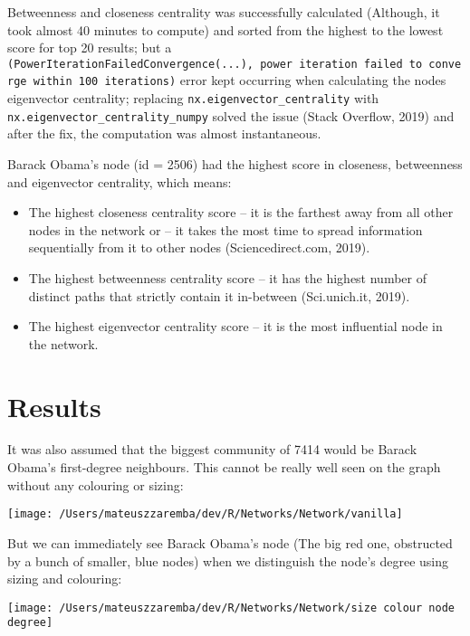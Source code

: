 \documentclass[
]{article}
\providecommand{\tightlist}{%
  \setlength{\itemsep}{0pt}\setlength{\parskip}{0pt}}
\begin{document}
Betweenness and closeness centrality was successfully calculated
(Although, it took almost 40 minutes to compute) and sorted from the
highest to the lowest score for top 20 results; but a
\texttt{(PowerIterationFailedConvergence(...),\ \textquotesingle{}power\ iteration\ failed\ to\ converge\ within\ 100\ iterations\textquotesingle{})}
error kept occurring when calculating the nodes eigenvector centrality;
replacing \texttt{nx.eigenvector\_centrality} with
\texttt{nx.eigenvector\_centrality\_numpy} solved the issue (Stack
Overflow, 2019) and after the fix, the computation was almost
instantaneous.

Barack Obama's node (id = 2506) had the highest score in closeness,
betweenness and eigenvector centrality, which means:

\begin{itemize}
\tightlist
\item
  The highest closeness centrality score -- it is the farthest away from
  all other nodes in the network or -- it takes the most time to spread
  information sequentially from it to other nodes (Sciencedirect.com,
  2019).
\item
  The highest betweenness centrality score -- it has the highest number
  of distinct paths that strictly contain it in-between (Sci.unich.it,
  2019).
\item
  The highest eigenvector centrality score -- it is the most influential
  node in the network.
\end{itemize}

\hypertarget{results}{%
\section{Results}\label{results}}

It was also assumed that the biggest community of 7414 would be Barack
Obama's first-degree neighbours. This cannot be really well seen on the
graph without any colouring or sizing:

\begin{center}\texttt{[image: /Users/mateuszzaremba/dev/R/Networks/Network/vanilla]} \end{center}

But we can immediately see Barack Obama's node (The big red one,
obstructed by a bunch of smaller, blue nodes) when we distinguish the
node's degree using sizing and colouring:

\begin{center}\texttt{[image: /Users/mateuszzaremba/dev/R/Networks/Network/size colour node degree]} \end{center}
\end{document}
